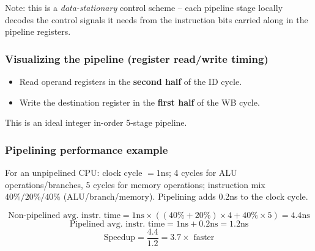 Note: this is a \emph{data-stationary} control scheme -- each pipeline stage
locally decodes the control signals it needs from the instruction bits
carried along in the pipeline registers.

\subsubsection{Visualizing the pipeline (register read/write timing)}

\begin{center}
\end{center}

\begin{itemize}
  \item Read operand registers in the \textbf{second half} of the ID cycle.
  \item Write the destination register in the \textbf{first half} of the WB
  cycle.
\end{itemize}
This is an ideal integer in-order 5-stage pipeline.

\subsubsection{Pipelining performance example}

\begin{eg}
For an unpipelined CPU: clock cycle $=1$ns; 4 cycles for ALU
operations/branches, 5 cycles for memory operations; instruction mix
$40\%/20\%/40\%$ (ALU/branch/memory). Pipelining adds 0.2ns to the clock
cycle.

\[
  \text{Non-pipelined avg.\ instr.\ time} = 1\text{ns}\times((40\%+20\%)\times4 + 40\%\times5) = 4.4\text{ns}
\]
\[
  \text{Pipelined avg.\ instr.\ time} = 1\text{ns} + 0.2\text{ns} = 1.2\text{ns}
\]
\[
  \text{Speedup} = \frac{4.4}{1.2} = 3.7 \times \text{ faster}
\]
\end{eg}

